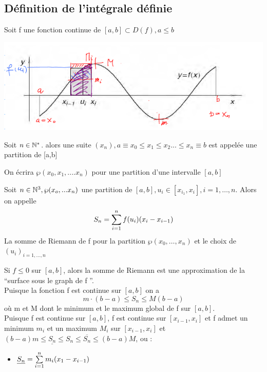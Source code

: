\documentclass[12pt,a4paper]{article}
\begin{document}
{\subsection{Définition de l'intégrale définie}
Soit f une fonction continue de \rtor $[a,b]\subset D(f), a\leq b$\\
\begin{center}
\includegraphics[scale=0.8]{illustrations_analyse/integrale}
\end{center}
\begin{boite}
	\Definition Soit $n \in \N^*$. alors une suite $(x_n), a \equiv x_0 \leq x_1 \leq x_2 ... \leq x_n \equiv b$ est appelée une partition de [a,b]
\end{boite}
 On écrira $\wp (x_0,x_1,....x_n)$ pour une partition d'une intervalle $[a,b]$
\begin{boite}
	Soit $n \in \N^3, \wp(x_o,...x_n)$ une partition de $[a,b], u_i \in [x_{i_1},x_i], i = 1,\ldots,n$. Alors on appelle
	\begin{equation}
		S_n = \somme{n}{i=1}{f(u_i)(x_i-x_{i-1})}
	\end{equation}	 
	La somme de Riemann de f pour la partition $\wp(x_0,\ldots, x_n)$ et le choix de $(u_i)_{i=1,\ldots,n}$
\end{boite}
\Remarque Si $f \leq 0$ sur $[a,b]$, alors la somme de Riemann est une approximation de la ``surface sous le graph de f ''.\\
\Remarque Puisque la fonction f est continue sur $[a,b]$ on a 
\begin{equation}
	m\cdot(b-a) \leq S_n \leq M(b-a)
\end{equation}
où m et M dont le minimum et le maximum global de f sur $[a,b]$.\\
\Remarque Puisque f est continue sur $[a,b]$, f est continue sur $[x_{i-1},x_i]$ et f admet un minimum $m_i$ et un maximum $M_i$ sur $[x_{i-1},x_i]$ et \\
$(b-a)m \leq \underline{S_n} \leq S_n \leq \overline{S_n} \leq (b-a)M$, ou :
\begin{itemize}
	\item $\underline{S_n} = \somme{n}{i=1}{m_i(x_1-x_{i-1})}$

\end{itemize}}
\end{document}
